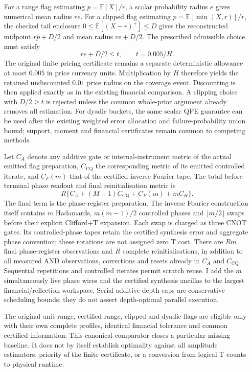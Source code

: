 For a range flag estimating $p=\mathbb E[X]/r$, a scalar probability radius
$e$ gives numerical mean radius $re$. For a clipped flag estimating
$p=\mathbb E[\min(X,r)]/r$, the checked tail enclosure
$0\leq\mathbb E[(X-r)^+]\leq D$ gives the reconstructed midpoint
$r\widehat p+D/2$ and mean radius $re+D/2$. The prescribed admissible choice
must satisfy
\[
 re+D/2\leq t,\qquad t=0.005/H.
\]
The original finite pricing certificate remains a separate deterministic
allowance at most $0.005$ in price currency units. Multiplication by $H$
therefore yields the retained undiscounted $0.01$ price radius on the
coverage event. Discounting is then applied exactly as in the existing
financial comparison. A clipping choice with $D/2\geq t$ is rejected unless
the common whole-prior argument already removes all estimation. For
dyadic buckets, the same scalar QPE guarantee can be used after the existing
weighted error allocation and failure-probability union bound; support,
moment and financial certificates remain common to competing methods.

Let $C_A$ denote any additive gate or internal-instrument metric of the actual emitted flag preparation,
$C_{\mathrm{CQ}}$ the corresponding metric of its emitted controlled
iterate, and $C_F(m)$ that of the certified inverse Fourier tape. The total before terminal phase readout and final reinitialisation
metric is
\begin{equation}
 R\{C_A+(M-1)C_{\mathrm{CQ}}+C_F(m)+mC_H\}.
 \label{eq:qpe-complete-charge}
\end{equation}
The final term is the phase-register preparation. The inverse Fourier
construction itself contains $m$ Hadamards, $m(m-1)/2$ controlled phases
and $\lfloor m/2\rfloor$ swaps before their explicit Clifford+T expansion.
Each swap is charged as three CNOT gates. Its controlled-phase tapes retain
the certified synthesis error and aggregate phase convention; these
rotations are not assigned zero T cost. There are $Rm$ final phase-register
observations and $R$ complete reinitialisations, in addition to all measured
AND observations, corrections and resets already in $C_A$ and
$C_{\mathrm{CQ}}$. Sequential repetitions and controlled iterates permit
scratch reuse. I add the $m$ simultaneously live phase wires and the
certified synthesis ancillas to the largest financial/reflection workspace.
Serial additive depth caps are conservative scheduling bounds; they do not
assert depth-optimal parallel execution.

The original unit-range, certified range, clipped and dyadic flags are
eligible only with their own complete profiles, identical financial
tolerance and common certified information. This canonical comparator
closes a particular missing baseline. It does not by itself establish
optimality against all amplitude estimators, priority of the finite
certificate, or a conversion from logical T counts to physical runtime.
